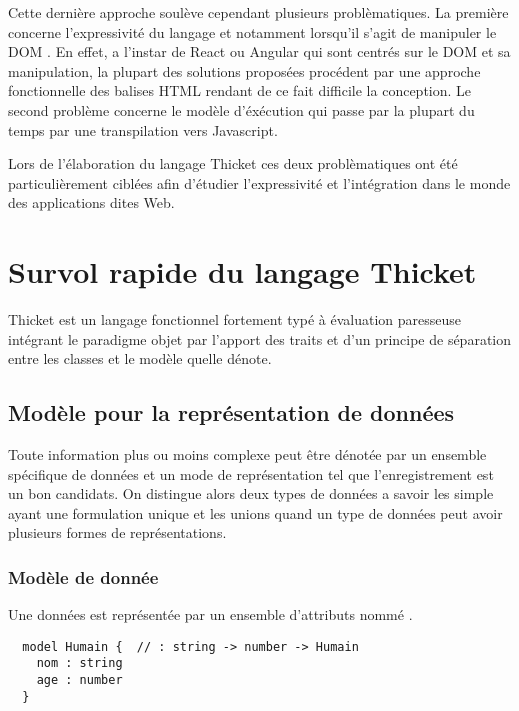 \documentclass[twoside,a4paper]{article}
\begin{document}
Cette dernière approche soulève cependant plusieurs problèmatiques. La
première  concerne l'expressivité  du langage  et notamment  lorsqu'il
s'agit de manipuler  le DOM \cite{dom}. En effet, a  l'instar de React
\cite{reacjs} ou Angular  \cite{angular2} qui sont centrés  sur le DOM
et sa manipulation,  la plupart des solutions  proposées procédent par
une  approche  fonctionnelle  des  balises HTML  rendant  de  ce  fait
difficile  la  conception.  Le  second  problème  concerne  le  modèle
d'éxécution qui  passe par la  plupart du temps par  une transpilation
vers Javascript.

Lors de l'élaboration  du langage Thicket ces  deux problèmatiques ont
été   particulièrement  ciblées   afin  d'étudier   l'expressivité  et
l'intégration dans le monde des applications dites Web.

\section{Survol rapide du langage Thicket}

Thicket  est  un  langage  fonctionnel  fortement  typé  à  évaluation
paresseuse  intégrant  le  paradigme  objet par  l'apport  des  traits
\cite{trait} et  d'un principe de  séparation entre les classes  et le
modèle quelle dénote.

\subsection{Modèle pour la représentation de données}

Toute  information plus  ou moins  complexe peut  être dénotée  par un
ensemble spécifique  de données et  un mode de représentation  tel que
l'enregistrement  \cite{RecordCalculus}  est  un  bon  candidats.   On
distingue alors  deux types de données  a savoir les simple  ayant une
formulation unique et  les unions quand un type de  données peut avoir
plusieurs formes de représentations.

\subsubsection{Modèle de donnée}

Une  données  est  représentée   par  un  ensemble  d'attributs  nommé
\cite{Cardelli} \cite{Haskell}.

\lstset{language=Thicket}
\begin{lstlisting}
  model Humain {  // : string -> number -> Humain
    nom : string   
    age : number
  }
\end{lstlisting}
\end{document}
